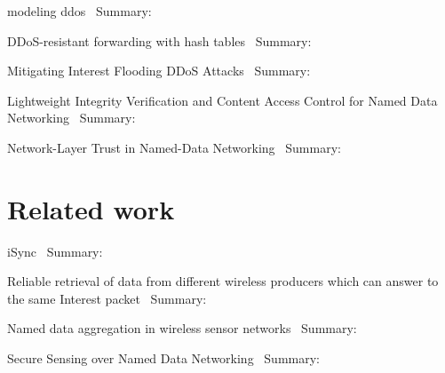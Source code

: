 modeling ddos~\cite{DBLP:journals/ijcomsys/WangCZQZ14}
Summary:


DDoS-resistant forwarding with hash tables~\cite{DBLP:conf/ancs/SoNO13}
Summary:


Mitigating Interest Flooding DDoS Attacks~\cite{DBLP:journals/corr/abs-1303-4823}
Summary:


Lightweight Integrity Verification and Content Access Control for Named Data Networking~\cite{DBLP:journals/tifs/LiZZSF15}
Summary:


Network-Layer Trust in Named-Data Networking~\cite{DBLP:journals/ccr/GhaliTU14}
Summary:


\section{Related work}
iSync~\cite{DBLP:conf/acmicn/FuAC14}
Summary:


Reliable retrieval of data from different wireless producers which can answer to the same Interest packet~\cite{DBLP:conf/acmicn/AmadeoCM14}
Summary:


Named data aggregation in wireless sensor networks~\cite{DBLP:conf/noms/AbidySLF14}
Summary:


Secure Sensing over Named Data Networking~\cite{DBLP:conf/nca/BurkeGNT14}
Summary:

